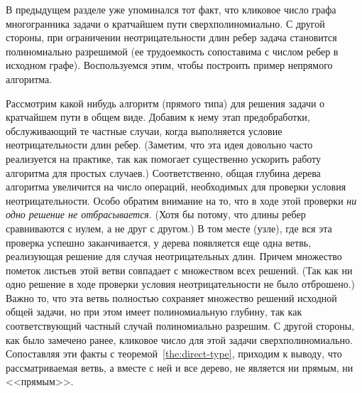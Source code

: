 В предыдущем разделе уже упоминался тот факт, что кликовое число графа многогранника
задачи о кратчайшем пути сверхполиномиально.
С другой стороны, при ограничении неотрицательности длин ребер задача становится 
полиномиально разрешимой (ее трудоемкость сопоставима с числом ребер в исходном графе).
Воспользуемся этим, чтобы построить пример непрямого алгоритма.

\begin{example}
	Рассмотрим какой нибудь алгоритм (прямого типа) 
	для решения задачи о кратчайшем пути в общем виде.
	Добавим к нему этап предобработки, обслуживающий те частные случаи,
	когда выполняется условие неотрицательности длин ребер.
	(Заметим, что эта идея довольно часто реализуется на практике, 
	так как помогает существенно ускорить работу алгоритма для простых случаев.)
	Соответственно, общая глубина дерева алгоритма увеличится на число операций,
	необходимых для проверки условия неотрицательности.
	Особо обратим внимание на то, что в ходе этой проверки
	\emph{ни одно решение не отбрасывается}.
	(Хотя бы потому, что длины ребер сравниваются с нулем, а не друг с другом.)
	В том месте (узле), где вся эта проверка успешно заканчивается, 
	у дерева появляется еще одна ветвь, 
	реализующая решение для случая неотрицательных длин.
	Причем множество пометок листьев этой ветви совпадает с множеством всех решений.
	(Так как ни одно решение в ходе проверки условия неотрицательности не было отброшено.)
	Важно то, что эта ветвь полностью сохраняет множество решений исходной общей задачи,
	но при этом имеет полиномиальную глубину, так как соответствующий
	частный случай полиномиально разрешим.
	С другой стороны, как было замечено ранее, 
	кликовое число для этой задачи сверхполиномиально.
	Сопоставляя эти факты с теоремой~\ref{the:direct-type},
	приходим к выводу, что рассматриваемая ветвь, а вместе с ней и все дерево, не является ни прямым, ни <<прямым>>.
\end{example}





%
%
